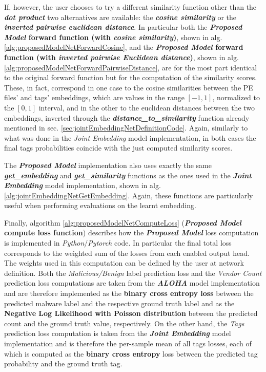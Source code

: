 \documentclass[pdfa%
,cucitura%
]{toptesi}
\begin{document}
If, however, the user chooses to try a different similarity function other than the \textbf{\textit{dot product}} two alternatives are available: the \textbf{\textit{cosine similarity}} or the \textbf{\textit{inverted pairwise euclidean distance}}. In particular both the \textbf{\textit{Proposed Model} forward function (with \textit{cosine similarity})}, shown in alg. \ref{alg:proposedModelNetForwardCosine}, and the \textbf{\textit{Proposed Model} forward function (with \textit{inverted pairwise Euclidean distance})}, shown in alg. \ref{alg:proposedModelNetForwardPairwiseDistance}, are for the most part identical to the original forward function but for the computation of the similarity scores. These, in fact, correspond in one case to the cosine similarities between the PE files' and tags' embeddings, which are values in the range $[-1,1]$, normalized to the $[0,1]$ interval, and in the other to the euclidean distances between the two embeddings, inverted through the \textbf{\textit{distance\_to\_similarity}} function already mentioned in sec. \ref{sec:jointEmbeddingNetDefinitionCode}. Again, similarly to what was done in the \textit{Joint Embedding} model implementation, in both cases the final tags probabilities coincide with the just computed similarity scores.

The \textbf{\textit{Proposed Model}} implementation also uses exactly the same \textbf{\textit{get\_embedding}} and \textbf{\textit{get\_similarity}} functions as the ones used in the \textbf{\textit{Joint Embedding}} model implementation, shown in alg. \ref{alg:jointEmbeddingNetGetEmbedding}. Again, these functions are particularly useful when performing evaluations on the learnt embedding.

Finally, algorithm \ref{alg:proposedModelNetComputeLoss} (\textbf{\textit{Proposed Model} compute loss function}) describes how the \textbf{\textit{Proposed Model}} loss computation is implemented in \textit{Python}/\textit{Pytorch} code. In particular the final total loss corresponds to the weighted sum of the losses from each enabled output head. The weights used in this computation can be defined by the user at network definition. Both the \textit{Malicious/Benign} label prediction loss and the \textit{Vendor Count} prediction loss computations are taken from the \textbf{\textit{ALOHA}} model implementation and are therefore implemented as the \textbf{binary cross entropy loss} between the predicted malware label and the respective ground truth label and as the \textbf{Negative Log Likelihood with Poisson distribution} between the predicted count and the ground truth value, respectively. On the other hand, the \textit{Tags} prediction loss computation is taken from the \textbf{\textit{Joint Embedding}} model implementation and is therefore the per-sample mean of all tags losses, each of which is computed as the \textbf{binary cross entropy} loss between the predicted tag probability and the ground truth tag.
\end{document}
